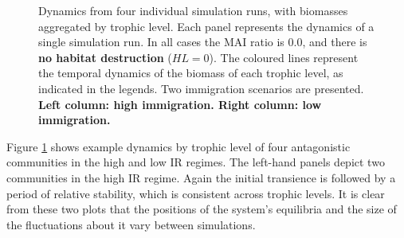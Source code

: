 \begin{itemize}
\begin{figure}
	\centering	
	\caption{Dynamics from four individual simulation runs, with biomasses aggregated by trophic level. Each panel represents the dynamics of a single simulation run. In all cases the MAI ratio is $0.0$, and there is \textbf{no habitat destruction} ($HL=0$).  The coloured lines represent the temporal dynamics of the biomass of each trophic level, as indicated in the legends. Two immigration scenarios are presented. \textbf{Left column: high immigration. Right column: low immigration.}}
	\label{fig:trophic_dynamics_example}
	
\end{figure}

Figure \ref{fig:trophic_dynamics_example} shows example dynamics by trophic level of four antagonistic communities in the high and low IR regimes. The left-hand panels depict two communities in the high IR regime. Again the initial transience is followed by a period of relative stability, which is consistent across trophic levels. It is clear from these two plots that the positions of the system's equilibria and the size of the fluctuations about it vary between simulations.  


\end{itemize}
